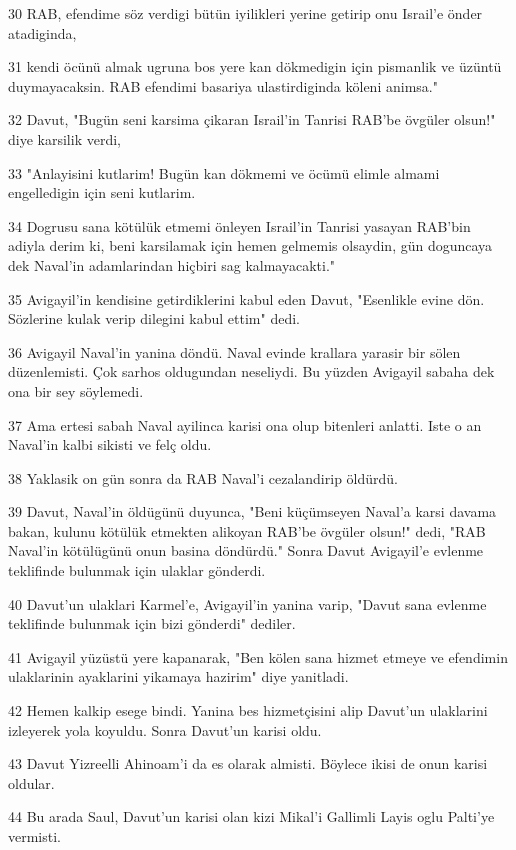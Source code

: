 \par 30 RAB, efendime söz verdigi bütün iyilikleri yerine getirip onu Israil'e önder atadiginda,
\par 31 kendi öcünü almak ugruna bos yere kan dökmedigin için pismanlik ve üzüntü duymayacaksin. RAB efendimi basariya ulastirdiginda köleni animsa."
\par 32 Davut, "Bugün seni karsima çikaran Israil'in Tanrisi RAB'be övgüler olsun!" diye karsilik verdi,
\par 33 "Anlayisini kutlarim! Bugün kan dökmemi ve öcümü elimle almami engelledigin için seni kutlarim.
\par 34 Dogrusu sana kötülük etmemi önleyen Israil'in Tanrisi yasayan RAB'bin adiyla derim ki, beni karsilamak için hemen gelmemis olsaydin, gün doguncaya dek Naval'in adamlarindan hiçbiri sag kalmayacakti."
\par 35 Avigayil'in kendisine getirdiklerini kabul eden Davut, "Esenlikle evine dön. Sözlerine kulak verip dilegini kabul ettim" dedi.
\par 36 Avigayil Naval'in yanina döndü. Naval evinde krallara yarasir bir sölen düzenlemisti. Çok sarhos oldugundan neseliydi. Bu yüzden Avigayil sabaha dek ona bir sey söylemedi.
\par 37 Ama ertesi sabah Naval ayilinca karisi ona olup bitenleri anlatti. Iste o an Naval'in kalbi sikisti ve felç oldu.
\par 38 Yaklasik on gün sonra da RAB Naval'i cezalandirip öldürdü.
\par 39 Davut, Naval'in öldügünü duyunca, "Beni küçümseyen Naval'a karsi davama bakan, kulunu kötülük etmekten alikoyan RAB'be övgüler olsun!" dedi, "RAB Naval'in kötülügünü onun basina döndürdü." Sonra Davut Avigayil'e evlenme teklifinde bulunmak için ulaklar gönderdi.
\par 40 Davut'un ulaklari Karmel'e, Avigayil'in yanina varip, "Davut sana evlenme teklifinde bulunmak için bizi gönderdi" dediler.
\par 41 Avigayil yüzüstü yere kapanarak, "Ben kölen sana hizmet etmeye ve efendimin ulaklarinin ayaklarini yikamaya hazirim" diye yanitladi.
\par 42 Hemen kalkip esege bindi. Yanina bes hizmetçisini alip Davut'un ulaklarini izleyerek yola koyuldu. Sonra Davut'un karisi oldu.
\par 43 Davut Yizreelli Ahinoam'i da es olarak almisti. Böylece ikisi de onun karisi oldular.
\par 44 Bu arada Saul, Davut'un karisi olan kizi Mikal'i Gallimli Layis oglu Palti'ye vermisti.

